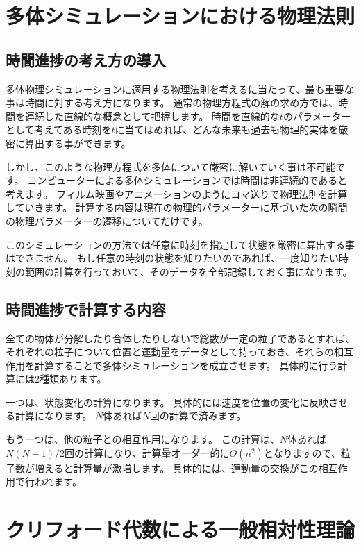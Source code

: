 \documentclass[a4paper,12pt,notitlepage]{jsreport}
\begin{document}
\chapter{多体シミュレーションにおける物理法則}

\section{時間進捗の考え方の導入}

多体物理シミュレーションに適用する物理法則を考えるに当たって、最も重要な事は時間に対する考え方になります。
通常の物理方程式の解の求め方では、時間を連続した直線的な概念として把握します。
時間を直線的な$t$のパラメーターとして考えてある時刻を$t$に当てはめれば、どんな未来も過去も物理的実体を厳密に算出する事ができます。

しかし、このような物理方程式を多体について厳密に解いていく事は不可能です。
コンピューターによる多体シミュレーションでは時間は非連続的であると考えます。
フィルム映画やアニメーションのようにコマ送りで物理法則を計算していきます。
計算する内容は現在の物理的パラメーターに基づいた次の瞬間の物理パラメーターの遷移についてだけです。

このシミュレーションの方法では任意に時刻を指定して状態を厳密に算出する事はできません。
もし任意の時刻の状態を知りたいのであれば、一度知りたい時刻の範囲の計算を行っておいて、そのデータを全部記録しておく事になります。

\section{時間進捗で計算する内容}

全ての物体が分解したり合体したりしないで総数が一定の粒子であるとすれば、
それぞれの粒子について位置と運動量をデータとして持っておき、それらの相互作用を計算することで多体シミュレーションを成立させます。
具体的に行う計算には2種類あります。

一つは、状態変化の計算になります。
具体的には速度を位置の変化に反映させる計算になります。
$N$体あれば$N$回の計算で済みます。

もう一つは、他の粒子との相互作用になります。
この計算は、$N$体あれば$N(N-1)/2$回の計算になり、計算量オーダー的に$O(n^2)$となりますので、粒子数が増えると計算量が激増します。
具体的には、運動量の交換がこの相互作用で行われます。

\chapter{クリフォード代数による一般相対性理論}
\end{document}
